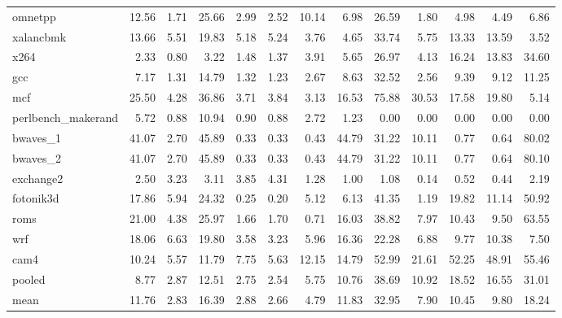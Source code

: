 \documentclass[10pt,a4paper]{article}
\begin{document}
{\begin{longtable}{@{}lrrrrrrrrrrrr@{}}
omnetpp & 12.56 & 1.71 & 25.66 & 2.99 & 2.52 & 10.14 & 6.98 & 26.59 & 1.80 & 4.98 & 4.49 & 6.86 \\
xalancbmk & 13.66 & 5.51 & 19.83 & 5.18 & 5.24 & 3.76 & 4.65 & 33.74 & 5.75 & 13.33 & 13.59 & 3.52 \\
x264 & 2.33 & 0.80 & 3.22 & 1.48 & 1.37 & 3.91 & 5.65 & 26.97 & 4.13 & 16.24 & 13.83 & 34.60 \\
gcc & 7.17 & 1.31 & 14.79 & 1.32 & 1.23 & 2.67 & 8.63 & 32.52 & 2.56 & 9.39 & 9.12 & 11.25 \\
mcf & 25.50 & 4.28 & 36.86 & 3.71 & 3.84 & 3.13 & 16.53 & 75.88 & 30.53 & 17.58 & 19.80 & 5.14 \\
perlbench\_makerand & 5.72 & 0.88 & 10.94 & 0.90 & 0.88 & 2.72 & 1.23 & 0.00 & 0.00 & 0.00 & 0.00 & 0.00 \\
bwaves\_1 & 41.07 & 2.70 & 45.89 & 0.33 & 0.33 & 0.43 & 44.79 & 31.22 & 10.11 & 0.77 & 0.64 & 80.02 \\
bwaves\_2 & 41.07 & 2.70 & 45.89 & 0.33 & 0.33 & 0.43 & 44.79 & 31.22 & 10.11 & 0.77 & 0.64 & 80.10 \\
exchange2 & 2.50 & 3.23 & 3.11 & 3.85 & 4.31 & 1.28 & 1.00 & 1.08 & 0.14 & 0.52 & 0.44 & 2.19 \\
fotonik3d & 17.86 & 5.94 & 24.32 & 0.25 & 0.20 & 5.12 & 6.13 & 41.35 & 1.19 & 19.82 & 11.14 & 50.92 \\
roms & 21.00 & 4.38 & 25.97 & 1.66 & 1.70 & 0.71 & 16.03 & 38.82 & 7.97 & 10.43 & 9.50 & 63.55 \\
wrf & 18.06 & 6.63 & 19.80 & 3.58 & 3.23 & 5.96 & 16.36 & 22.28 & 6.88 & 9.77 & 10.38 & 7.50 \\
cam4 & 10.24 & 5.57 & 11.79 & 7.75 & 5.63 & 12.15 & 14.79 & 52.99 & 21.61 & 52.25 & 48.91 & 55.46 \\
\midrule
pooled & 8.77 & 2.87 & 12.51 & 2.75 & 2.54 & 5.75 & 10.76 & 38.69 & 10.92 & 18.52 & 16.55 & 31.01 \\
mean & 11.76 & 2.83 & 16.39 & 2.88 & 2.66 & 4.79 & 11.83 & 32.95 & 7.90 & 10.45 & 9.80 & 18.24 \\
\end{longtable}
}
\end{document}
